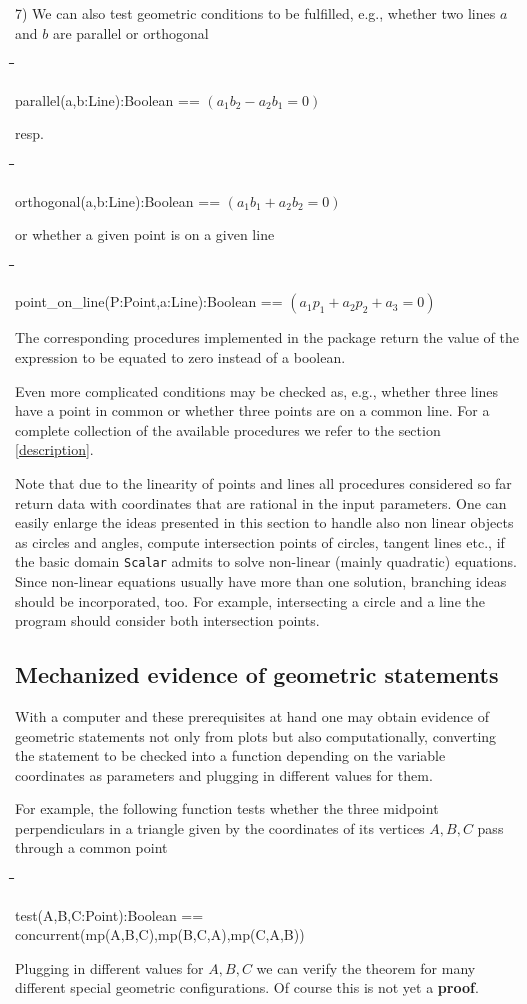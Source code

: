 \documentclass{article}
\newenvironment{code}{\tt \begin{tabbing}
\hspace*{1cm}\=\hspace*{1cm}\=\hspace*{1cm}\=
\hspace*{1cm}\=\hspace*{1cm}\=\kill
}{\end{tabbing}}
\begin{document}
7) We can also test geometric conditions to be fulfilled, e.g., whether
two lines $a$ and $b$ are parallel or orthogonal
\begin{code}
parallel(a,b:Line):Boolean == $(a_{1}b_{2}-a_{2}b_{1}=0)$
\end{code}
resp.
\begin{code}
orthogonal(a,b:Line):Boolean == $(a_{1}b_{1}+a_{2}b_{2}=0)$
\end{code}
or whether a given point is on a given line
\begin{code}
point\_on\_line(P:Point,a:Line):Boolean ==
$(a_{1}p_{1}+a_{2}p_{2}+a_{3}=0)$
\end{code}
The corresponding procedures implemented in the package return the
value of the expression to be equated to zero instead of a boolean.

Even more complicated conditions may be checked as, e.g., whether
three lines have a point in common or whether three points are on a
common line. For a complete collection of the available procedures we
refer to the section \ref{description}.
\medskip

Note that due to the linearity of points and lines all procedures
considered so far return data with coordinates that are rational in
the input parameters. One can easily enlarge the ideas presented in
this section to handle also non linear objects as circles and angles,
compute intersection points of circles, tangent lines etc., if the
basic domain {\tt Scalar} admits to solve non-linear (mainly
quadratic) equations. Since non-linear equations usually have more
than one solution, branching ideas should be incorporated, too. For
example, intersecting a circle and a line the program should consider
both intersection points.

\subsection{Mechanized evidence of geometric statements}

With a computer and these prerequisites at hand one may obtain
evidence of geometric statements not only from plots but also
computationally, converting the statement to be checked into a
function depending on the variable coordinates as parameters and
plugging in different values for them. 

For example, the following function tests whether the three midpoint
perpendiculars in a triangle given by the coordinates of its vertices
$A,B,C$ pass through a common point
\begin{code}
test(A,B,C:Point):Boolean ==\\\>\>\> 
concurrent(mp(A,B,C),mp(B,C,A),mp(C,A,B))
\end{code}
Plugging in different values for $A,B,C$ we can verify the theorem for
many different special geometric configurations. Of course this is
not yet a {\bf proof}.
\medskip
\end{document}
